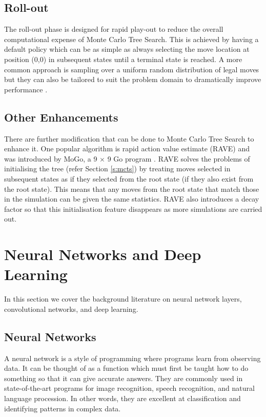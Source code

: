 \documentclass{bhamthesis}
\theoremstyle{definition}
\begin{document}
\subsection{Roll-out}\label{s:rollOut}
The roll-out phase is designed for rapid play-out to reduce the overall computational expense of Monte Carlo Tree Search. This is achieved by having a default policy which can be as simple as always selecting the move location at position (0,0) in subsequent states until a terminal state is reached. A more common approach is sampling over a uniform random distribution of legal moves but they can also be tailored to suit the problem domain to dramatically improve performance \cite{Browne2012}.

\subsection{Other Enhancements}
There are further modification that can be done to Monte Carlo Tree Search to enhance it. One popular algorithm is rapid action value estimate (RAVE) and was introduced by MoGo, a 9 $\times$ 9 Go program \cite{Gelly2007}. RAVE solves the problems of initialising the tree (refer Section \ref{s:mcts}) by treating moves selected in subsequent states as if they selected from the root state (if they also exist from the root state).
This means that any moves from the root state that match those in the simulation can be given the same statistics. RAVE also introduces a decay factor so that this initialisation feature disappears as more simulations are carried out.

\section{Neural Networks and Deep Learning}\label{s:NN}
In this section we cover the background literature on neural network layers, convolutional networks, and deep learning.

\subsection{Neural Networks}
A neural network is a style of programming where programs learn from observing data. It can be thought of as a function which must first be taught how to do something so that it can give accurate answers. They are commonly used in state-of-the-art programs for image recognition, speech recognition, and natural language procession. In other words, they are excellent at classification and identifying patterns in complex data.
\end{document}
